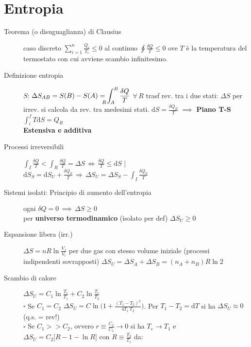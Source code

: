 \documentclass[10pt, oneside]{article}
\begin{document}
\section{Entropia}
\begin{description}
\item[\large Teorema (o disuguaglianza) di Clausius] caso discreto $\boxed{\displaystyle \sum\limits_{i=1}^n \frac{Q_i}{T_i} \leq 0}$ al continuo $\boxed{\displaystyle \oint \frac{\delta Q}{T} \leq 0}$ ove $T$ è la temperatura del termostato con cui avviene scambio infinitesimo.
\item[Definizione entropia] $S$: $\displaystyle \Delta S_{AB} = S(B) - S(A) = \int_{\hspace{-0.45cm} R \hspace{0.22cm} A}^B\frac{\delta Q}{T}$ $\forall \, R$ trasf rev. tra i due stati: $\Delta S$ per irrev. si calcola da rev. tra medesimi stati. $\displaystyle \mathrm{d}S = \frac{\delta Q_R}{T}$ $\implies$ \textbf{Piano T-S} $\displaystyle \int_i^f T\mathrm{d}S = Q_R$
\\\textbf{Estensiva e additiva}
\item[Processi irreversibili] $\displaystyle \int_I\frac{\delta Q}{T} < \int_R\frac{\delta Q}{T} = \Delta S \, \Leftrightarrow \, \frac{\delta Q}{T} \leq \mathrm{d}S$ \bigg| $\displaystyle \mathrm{d}S_S = \mathrm{d}S_U + \frac{\delta Q_S}{T} \, \Rightarrow \, \displaystyle \Delta S_U = \Delta S_S - \int_I \frac{\delta Q_S}{T}$
\item[Sistemi isolati: \large Principio di aumento dell'entropia] ogni $\delta Q = 0 \, \implies \, \Delta S \geq 0$ \\per \textbf{universo termodinamico} (isolato per def) $\displaystyle \Delta S_U \geq 0$
\item[Espansione libera (irr.)] $\displaystyle \Delta S = n R \ln \frac{V_f}{V_i}$ per due gas con stesso volume iniziale (processi indipendenti sovrapposti) $\displaystyle \Delta S_U = \Delta S_A + \Delta S_B = (n_A + n_B) R \ln2$
\item[Scambio di calore] $\displaystyle \Delta S_U = C_1 \ln \frac{T_e}{T_1} + C_2 \ln \frac{T_e}{T_2}$
\\$\square$ Se $C_1 = C_2$ $\displaystyle \Delta S_U = C \ln \bigg(\displaystyle 1+ \frac{(T_1 - T_2)^2}{4 T_1 \, T_2}\bigg)$. Per $T_1 - T_2 = \mathrm{d}T$ si ha $\Delta S_U 	\approx 0$ (q.s. = rev!)
\\$\square$ Se $C_1 >> C_2$, ovvero $\displaystyle r \equiv \frac{C_2}{C_1} \rightarrow 0$ si ha $T_e \rightarrow T_1$ e $\boxed{\displaystyle \Delta S_U = C_2 \big[R - 1 - \ln R \big]}$ con $\displaystyle R \equiv \frac{T_2}{T_1}$ da:

\end{description}
\end{document}
